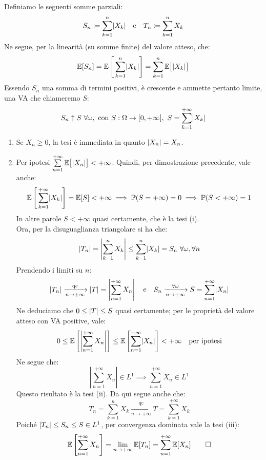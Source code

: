 \smallskip
\begin{dimo}
  Definiamo le seguenti somme parziali:
  $$S_n \coloneqq \sum_{k=1}^{n}\lvert X_k\rvert \quad \text{e} \quad T_n \coloneqq \sum_{k=1}^{n}X_k$$
  Ne segue, per la linearità (su somme finite) del valore atteso, che:
  $$\mathbb E[S_n] = \mathbb E \left[\,\sum_{k=1}^{n}\lvert X_k\rvert\right] = \sum\limits_{k=1}^{n}\mathbb E\big[\lvert X_k\rvert\big]$$
  Essendo $S_n$ una somma di termini positivi, è crescente e ammette pertanto limite, una VA che chiameremo $S$:
  $$S_n \uparrow S \ \forall \omega, \ \text{con} \ S: \Omega \to [0, +\infty], \ S = \sum_{k=1}^{+\infty}\abs{X_k}$$
  \begin{enumerate}
    \item Se $X_n \ge 0$, la tesi è immediata in quanto $\lvert X_n\rvert = X_n$.
    \item Per ipotesi $\sum\limits_{n=1}^{+\infty} \mathbb E\big[\lvert X_n\rvert\big] < +\infty$.
    Quindi, per dimostrazione precedente, vale anche:
    $$\mathbb E\left[\,\sum_{k=1}^{+\infty}\lvert X_k\rvert \right] = \mathbb E[S] < +\infty
    \implies \mathbb P(S=+\infty) = 0
    \implies \mathbb P(S<+\infty) = 1$$
    In altre parole $S<+\infty$ quasi certamente, che è la tesi (i). \\
    Ora, per la disuguaglianza triangolare si ha che:
    $$ \lvert T_n\rvert = \left\lvert\sum_{k=1}^{n}X_k\right\lvert \le \sum_{k=1}^{n}\lvert X_k\rvert = S_n \ \forall \omega, \forall n$$
    Prendendo i limiti su $n$:
    $$ \lvert T_n\rvert \xrightarrow[n \to +\infty]{\text{qc}} \lvert T\rvert = \left\lvert\sum_{n=1}^{+\infty}X_n\right\lvert \quad \text{e} \quad
    S_n \xrightarrow[n \to +\infty]{\forall \omega} S = \sum_{n=1}^{+\infty} \lvert X_n\rvert$$
    Ne deduciamo che $0 \le \lvert T\rvert \le S$ quasi certamente; per le proprietà del valore atteso con VA positive, vale:
    $$ 0 \le \mathbb E \left[\left\lvert\sum_{n=1}^{+\infty}X_n\right\lvert\right] \le
    \mathbb E\left[\sum_{n=1}^{+\infty}\lvert X_n\rvert\right] < +\infty \quad \text{per ipotesi}$$
    Ne segue che:
    $$ \left\lvert\sum_{n=1}^{+\infty}X_n\right\lvert \in L^1
    \implies \sum_{n=1}^{+\infty}X_n \in L^1$$
    Questo risultato è la tesi (ii).
    Da qui segue anche che:
    $$T_n = \sum_{k=1}^{n}X_k \xrightarrow[n \to +\infty]{\text{qc}} T = \sum_{k=1}^{+\infty}X_k$$
    Poiché $\lvert T_n\rvert \le S_n \le S \in L^1$, per convergenza dominata vale la tesi (iii):
    $$\mathbb E\left[\sum_{n=1}^{+\infty}X_n\right] =
    \lim_{n \to +\infty}\mathbb E[T_n] = \sum_{n=1}^{+\infty} \mathbb E[X_n] \qedhere
    $$
  \end{enumerate}
\end{dimo}

